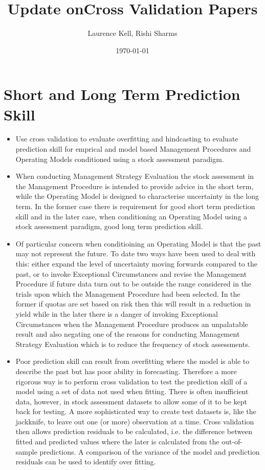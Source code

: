 \documentclass[a4paper,10pt]{article}
\title{Update onCross Validation Papers}
\author{Laurence Kell, Rishi Sharms}
\date{\today	}
\begin{document}
\maketitle

\section*{Short and Long Term Prediction Skill}


\begin{itemize}
 \item Use cross validation to evaluate overfitting and hindcasting to evaluate prediction skill for emprical and model based Management Procedures and Operating Models conditioned using a stock assessment paradigm.
 \item When conducting Management Strategy Evaluation the stock assessment in the Management Procedure is intended to provide advice in the short term, while the Operating Model is designed to characterise uncertainty in the long term. In the former case there is requirement for good short term prediction skill and in the later case, when conditioning an Operating Model using a stock assessment paradigm,  good long term prediction skill. 
 \item Of particular concern when conditioining an Operating Model is that the past may not represent the future. To date two ways have been used to deal with this: either expand the level of uncertainty moving forwards compared to the past, or to invoke Exceptional Circumstances and revise the Management Procedure if future data turn out to be outside the range considered in the trials upon which the Management Procedure had been selected. In the former if quotas are set based on risk then this will result in a reduction in yield while in the later there is a danger of invoking Exceptional Circumstances when the Management Procedure produces an unpalatable result and also negating one of the reasons for conducting Management Strategy Evaluation which is to reduce the frequency of stock assessments.   
 \item Poor prediction skill can result from overfitting where the model is able to describe the past but has poor ability in forecasting. Therefore a more rigorous way is to perform cross validation to test the prediction skill of a model using a set of data not used when fitting. There is often insufficient data, however, in stock assessment datasets to allow some of it to be kept back for testing. A more sophisticated way to create test datasets is, like the jackknife, to leave out one (or more) observation at a time. Cross validation then allows prediction residuals to be calculated, i.e. the difference between fitted and predicted values where the later is calculated from the out-of-sample predictions. A comparison of the variance of the model and prediction residuals can be used to identify over fitting.

\end{itemize}
\end{document}
